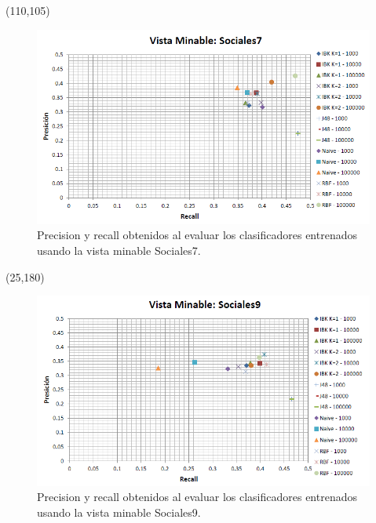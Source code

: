 \documentclass{article}
\begin{document}
\begin{textblock}{80}(110,105)
\begin{figure}[!htb]
\begin{centering}
\includegraphics[scale=0.4]{sociales7}
\par\end{centering}
\caption{Precision y recall obtenidos al evaluar los clasificadores entrenados usando la vista minable Sociales7.}
\label{fig:figura20}
\end{figure}
\end{textblock}

\begin{textblock}{80}(25,180)
\begin{figure}[!htb]
\begin{centering}
\includegraphics[scale=0.4]{sociales9}
\par\end{centering}
\caption{Precision y recall obtenidos al evaluar los clasificadores entrenados usando la vista minable Sociales9.}
\label{fig:figura21}
\end{figure}
\end{textblock}
\end{document}

